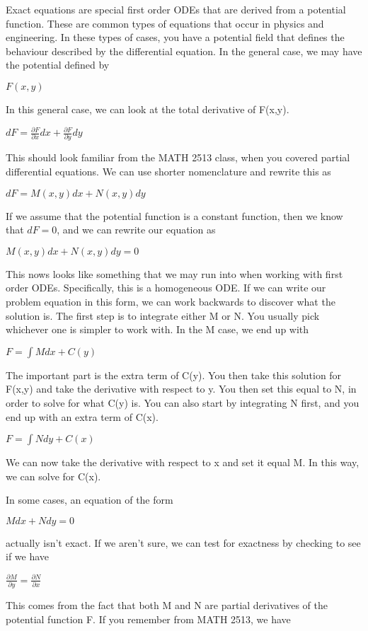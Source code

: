 \documentclass[
  letterpaper,
]{report}
\begin{document}
Exact equations are special first order ODEs that are derived from a
potential function. These are common types of equations that occur in
physics and engineering. In these types of cases, you have a potential
field that defines the behaviour described by the differential equation.
In the general case, we may have the potential defined by

\(F(x,y)\)

In this general case, we can look at the total derivative of F(x,y).

\(dF = \frac{\partial F}{\partial x} dx + \frac{\partial F}{\partial y} dy\)

This should look familiar from the MATH 2513 class, when you covered
partial differential equations. We can use shorter nomenclature and
rewrite this as

\(dF = M(x,y) dx + N(x,y) dy\)

If we assume that the potential function is a constant function, then we
know that \(dF = 0\), and we can rewrite our equation as

\(M(x,y) dx + N(x,y) dy = 0\)

This nows looks like something that we may run into when working with
first order ODEs. Specifically, this is a homogeneous ODE. If we can
write our problem equation in this form, we can work backwards to
discover what the solution is. The first step is to integrate either M
or N. You usually pick whichever one is simpler to work with. In the M
case, we end up with

\(F = \int M dx + C(y)\)

The important part is the extra term of C(y). You then take this
solution for F(x,y) and take the derivative with respect to y. You then
set this equal to N, in order to solve for what C(y) is. You can also
start by integrating N first, and you end up with an extra term of C(x).

\(F = \int N dy + C(x)\)

We can now take the derivative with respect to x and set it equal M. In
this way, we can solve for C(x).

In some cases, an equation of the form

\(M dx + N dy = 0\)

actually isn't exact. If we aren't sure, we can test for exactness by
checking to see if we have

\(\frac{\partial M}{\partial y} = \frac{\partial N}{\partial x}\)

This comes from the fact that both M and N are partial derivatives of
the potential function F. If you remember from MATH 2513, we have
\end{document}
